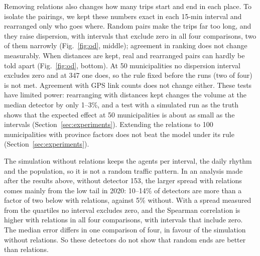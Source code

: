 \documentclass[11pt,a4paper]{article}
\begin{document}
Removing relations also changes how many trips start and end in each place. To isolate the pairings, we kept these numbers exact in each 15-min interval and rearranged only who goes where. Random pairs make the trips far too long, and they raise dispersion, with intervals that exclude zero in all four comparisons, two of them narrowly (Fig.~\ref{fig:od}, middle); agreement in ranking does not change measurably. When distances are kept, real and rearranged pairs can hardly be told apart (Fig.~\ref{fig:od}, bottom). At 50 municipalities no dispersion interval excludes zero and at 347 one does, so the rule fixed before the runs (two of four) is not met. Agreement with GPS link counts does not change either. These tests have limited power: rearranging with distances kept changes the volume at the median detector by only 1--3\%, and a test with a simulated run as the truth shows that the expected effect at 50 municipalities is about as small as the intervals (Section~\ref{sec:experiments}). Extending the relations to 100 municipalities with province factors does not beat the model under its rule (Section~\ref{sec:experiments}).

The simulation without relations keeps the agents per interval, the daily rhythm and the population, so it is not a random traffic pattern. In an analysis made after the results above, without detector 153, the larger spread with relations comes mainly from the low tail in 2020: 10--14\% of detectors are more than a factor of two below with relations, against 5\% without. With a spread measured from the quartiles no interval excludes zero, and the Spearman correlation is higher with relations in all four comparisons, with intervals that include zero. The median error differs in one comparison of four, in favour of the simulation without relations. So these detectors do not show that random ends are better than relations.
\end{document}
